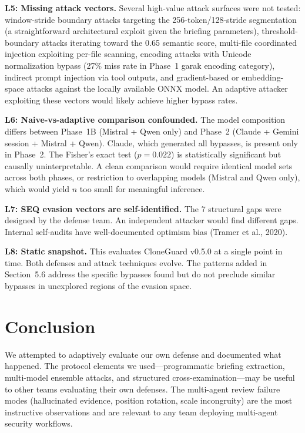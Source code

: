 \documentclass[11pt]{article}
\begin{document}
\textbf{L5: Missing attack vectors.} Several high-value attack surfaces were not tested: window-stride boundary attacks targeting the 256-token/128-stride segmentation (a straightforward architectural exploit given the briefing parameters), threshold-boundary attacks iterating toward the 0.65 semantic score, multi-file coordinated injection exploiting per-file scanning, encoding attacks with Unicode normalization bypass (27\% miss rate in Phase~1 garak encoding category), indirect prompt injection via tool outputs, and gradient-based or embedding-space attacks against the locally available ONNX model. An adaptive attacker exploiting these vectors would likely achieve higher bypass rates.

\textbf{L6: Naive-vs-adaptive comparison confounded.} The model composition differs between Phase~1B (Mistral + Qwen only) and Phase~2 (Claude + Gemini session + Mistral + Qwen). Claude, which generated all bypasses, is present only in Phase~2. The Fisher's exact test (\(p = 0.022\)) is statistically significant but causally uninterpretable. A clean comparison would require identical model sets across both phases, or restriction to overlapping models (Mistral and Qwen only), which would yield \(n\) too small for meaningful inference.

\textbf{L7: SEQ evasion vectors are self-identified.} The 7 structural gaps were designed by the defense team. An independent attacker would find different gaps. Internal self-audits have well-documented optimism bias (Tramer et al., 2020).

\textbf{L8: Static snapshot.} This evaluates CloneGuard v0.5.0 at a single point in time. Both defenses and attack techniques evolve. The patterns added in Section~5.6 address the specific bypasses found but do not preclude similar bypasses in unexplored regions of the evasion space.

\section{Conclusion}

We attempted to adaptively evaluate our own defense and documented what happened. The protocol elements we used---programmatic briefing extraction, multi-model ensemble attacks, and structured cross-examination---may be useful to other teams evaluating their own defenses. The multi-agent review failure modes (hallucinated evidence, position rotation, scale incongruity) are the most instructive observations and are relevant to any team deploying multi-agent security workflows.
\end{document}

